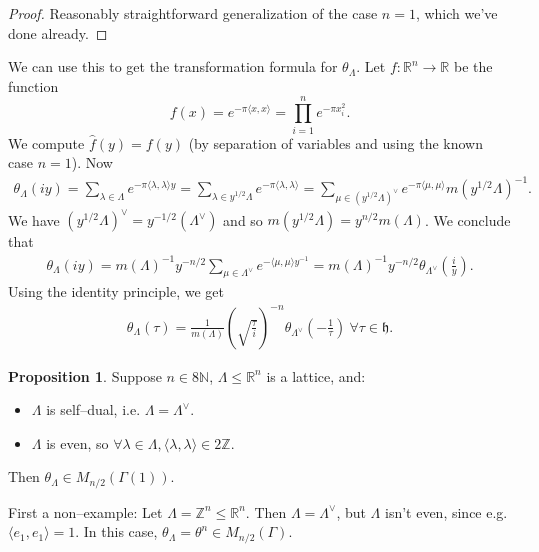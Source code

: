 \documentclass{article}
\theoremstyle{definition}
\newtheorem{prop}[theorem]{Proposition}
\begin{document}
\begin{proof}
    Reasonably straightforward generalization of the case $n=1$, which we've done already.
\end{proof}
We can use this to get the transformation formula for $\theta_{\Lambda}$. Let $f: \mathbb{R}^n \to \mathbb{R}$ be the function $$f(x) = e^{-\pi \langle x,x \rangle} = \prod_{i=1}^{n} e^{-\pi x_i^2}.$$
We compute $\hat{f}(y) = f(y)$ (by separation of variables and using the known case $n=1$). Now 
\begin{align*}
    \theta_{\Lambda}(iy) = \sum_{\lambda \in \Lambda}^{} e^{-\pi \langle \lambda, \lambda \rangle y} = \sum_{\lambda \in y^{1/2}\Lambda}^{} e^{- \pi \langle \lambda, \lambda \rangle} = \sum_{\mu \in (y^{1/2}\Lambda)^\vee} e^{-\pi \langle \mu, \mu \rangle} m(y^{1/2}\Lambda)^{-1}.
\end{align*}
We have $(y^{1/2}\Lambda)^{\vee} = y^{-1/2}(\Lambda^\vee)$ and so $m(y^{1/2}\Lambda)=y^{n/2}m(\Lambda)$. We conclude that 
\begin{align*}
    \theta_{\Lambda}(iy) = m(\Lambda)^{-1} y^{-n/2} \sum_{\mu \in \Lambda^{\vee}} e^{- \langle \mu, \mu \rangle y^{-1}} = m(\Lambda)^{-1}y^{-n/2}\theta_{\Lambda^\vee}\left(\frac{i}{y}\right).
\end{align*}
Using the identity principle, we get \begin{align*}
    \theta_\Lambda(\tau) = \frac{1}{m(\Lambda)} \left(\sqrt{\frac{\tau}{i}}\right)^{-n} \theta_{\Lambda^\vee} \left(-\frac{1}{\tau}\right) ~\forall \tau \in \mathfrak{h}.
\end{align*}
\begin{prop}
    Suppose $n \in 8\mathbb{N}$, $\Lambda \le \mathbb{R}^n$ is a lattice, and:
    \begin{itemize}
        \item $\Lambda$ is self--dual, i.e. $\Lambda = \Lambda^\vee$.
        \item $\Lambda$ is even, so $\forall \lambda \in \Lambda, \langle \lambda, \lambda \rangle \in 2\mathbb{Z}$.
    \end{itemize}
    Then $\theta_{\Lambda} \in M_{n/2}(\Gamma(1))$.
\end{prop}
First a non--example: Let $\Lambda = \mathbb{Z}^n \le \mathbb{R}^n$. Then $\Lambda = \Lambda^{\vee}$, but $\Lambda$ isn't even, since e.g. $\langle e_1, e_1 \rangle = 1$. In this case, $\theta_{\Lambda} = \theta^n \in M_{n/2}(\Gamma)$.
\end{document}
